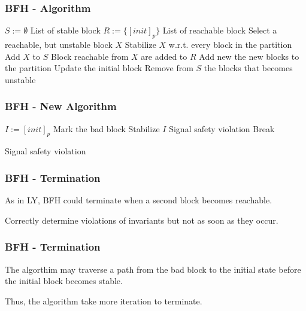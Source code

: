 \documentclass[11pt,handout]{beamer}
\begin{document}
\begin{frame}[fragile]
  \frametitle{BFH - Algorithm}
  \begin{algorithmic}[1]
    \State $S := \emptyset$ List of stable block
    \State $R := \{[init]_p\}$ List of reachable block
    \State Select a reachable, but unstable block $X$
    \State Stabilize $X$ w.r.t. every block in the partition
    \State Add $X$ to $S$
    \State Block reachable from $X$ are added to $R$
    \Else
    \State Add new the new blocks to the partition
    \State Update the initial block
    \State Remove from $S$ the blocks that becomes unstable
    \EndIf
    \EndWhile
  \end{algorithmic}
\end{frame}

\begin{frame}[fragile]
  \frametitle{BFH - New Algorithm}
  \begin{algorithmic}[1]
    \State $I := [init]_p$
    \State Mark the bad block
    \State Stabilize $I$
    \State Signal safety violation
    \Else
    \State Break
    \EndIf
    \Else
    
    \EndIf
    \EndWhile
    \State Signal safety violation
    \EndIf
  \end{algorithmic}
\end{frame}

\begin{frame}
  \frametitle{BFH - Termination}
  As in LY, BFH could terminate when a second block becomes reachable.
  
  \pause
  \vspace*{0.5cm}

  Correctly determine violations of invariants but not as soon as they occur.
\end{frame}

\begin{frame}
  \frametitle{BFH - Termination}

  The algorthim may traverse a path from the bad block to the initial state
  before the initial block becomes stable.

  \pause
  \vspace*{0.5cm}

  Thus, the algorithm take more iteration to terminate.
\end{frame}
\end{document}
